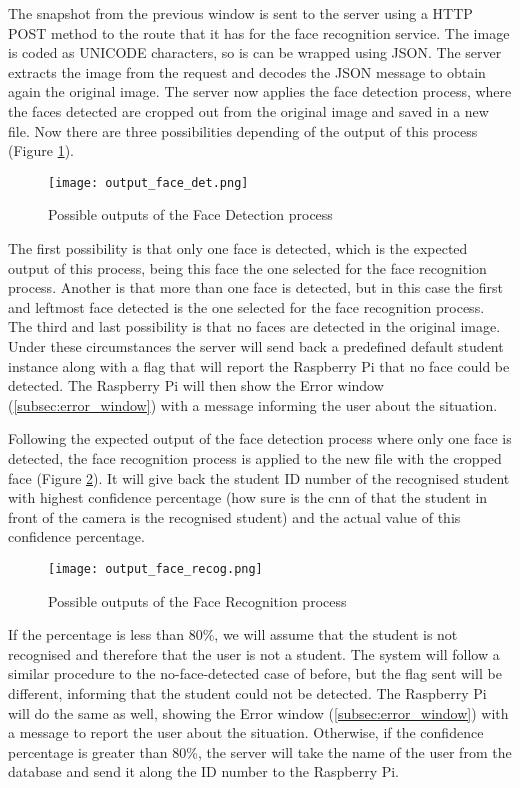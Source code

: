	The snapshot from the previous window is sent to the server using a HTTP POST method to the route that it has for the face recognition service. The image is coded as UNICODE characters, so is can be wrapped using JSON. The server extracts the image from the request and decodes the JSON message to obtain again the original image. The server now applies the face detection process, where the faces detected are cropped out from the original image and saved in a new file. Now there are three possibilities depending of the output of this process (Figure \ref{fig:output_face_det}).

	\begin{figure}[!ht]
		\centering
		\texttt{[image: output\_face\_det.png]}
		\caption{Possible outputs of the Face Detection process}
		\label{fig:output_face_det}
	\end{figure}

	The first possibility is that only one face is detected, which is the expected output of this process, being this face the one selected for the face recognition process. Another is that more than one face is detected, but in this case the first and leftmost face detected is the one selected for the face recognition process. The third and last possibility is that no faces are detected in the original image. Under these circumstances the server will send back a predefined default student instance along with a flag that will report the Raspberry Pi that no face could be detected. The Raspberry Pi will then show the Error window (\ref{subsec:error_window}) with a message informing the user about the situation.

	Following the expected output of the face detection process where only one face is detected, the face recognition process is applied to the new file with the cropped face (Figure \ref{fig:output_face_recog}). It will give back the student ID number of the recognised student with highest confidence percentage (how sure is the \gls{cnn} of that the student in front of the camera is the recognised student) and the actual value of this confidence percentage. 

	\begin{figure}[!ht]
		\centering
		\texttt{[image: output\_face\_recog.png]}
		\caption{Possible outputs of the Face Recognition process}
		\label{fig:output_face_recog}
	\end{figure}

	If the percentage is less than 80\%, we will assume that the student is not recognised and therefore that the user is not a student. The system will follow a similar procedure to the no-face-detected case of before, but the flag sent will be different, informing that the student could not be detected. The Raspberry Pi will do the same as well, showing the Error window (\ref{subsec:error_window}) with a message to report the user about the situation. Otherwise, if the confidence percentage is greater than 80\%, the server will take the name of the user from the database and send it along the ID number to the Raspberry Pi.


